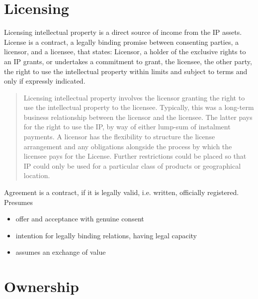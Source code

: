 \documentclass[10pt,a4paper,twocolumn]{article}
\begin{document}

\section{Licensing} %
\label{sec:licensing}

Licensing intellectual property is a direct source of income from the IP assets. License
is a contract, a legally binding promise between consenting parties, a licensor, and a
licensee, that states: Licensor, a holder of the exclusive rights to an IP grants, or
undertakes a commitment to grant, the licensee, the other party, the right to use the
intellectual property within limits and subject to terms and only if expressly indicated.
\begin{quote}
  Licensing intellectual property involves the licensor granting the right to use the
  intellectual property to the licensee. Typically, this was a long-term business relationship
  between the licensor and the licensee. The latter pays for the right to use the IP, by
  way of either lump-sum of instalment payments. A licensor has the flexibility to structure
  the license arrangement and any obligations alongside the process by which the licensee
  pays for the License. Further restrictions could be placed so that IP could only be used
  for a particular class of products or geographical location.
\end{quote}

Agreement is a contract, if it is legally valid, i.e. written, officially registered. Presumes
\begin{itemize}
  \item offer and acceptance with genuine consent
  \item intention for legally binding relations, having legal capacity
  \item assumes an exchange of value
\end{itemize}


\section{Ownership} %
\label{sec:ownership}
\end{document}
